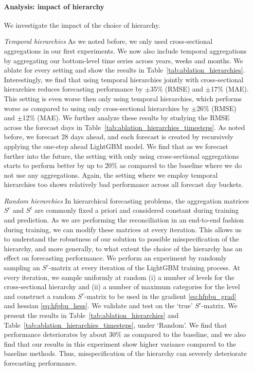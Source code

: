 \documentclass[preprint, 3p, times, twocolumn]{elsarticle}
\begin{document}
  \paragraph{Analysis: impact of hierarchy} We investigate the impact of the choice of hierarchy. 
  
  \textit{Temporal hierarchies} As we noted before, we only used cross-sectional aggregations in our first experiments. We now also include temporal aggregations by aggregating our bottom-level time series across years, weeks and months. We ablate for every setting and show the results in Table~\ref{tab:ablation_hierarchies}. Interestingly, we find that using temporal hierarchies jointly with cross-sectional hierarchies reduces forecasting performance by $\pm$35\% (RMSE) and $\pm$17\% (MAE). This setting is even worse then only using temporal hierarchies, which performs worse as compared to using only cross-sectional hierarchies by $\pm$26\% (RMSE) and $\pm$12\% (MAE). We further analyze these results by studying the RMSE across the forecast days in Table~\ref{tab:ablation_hierarchies_timesteps}. As noted before, we forecast 28 days ahead, and each forecast is created by recursively applying the one-step ahead LightGBM model. We find that as we forecast further into the future, the setting with only using cross-sectional aggregations starts to perform better by up to 20\% as compared to the baseline where we do not use any aggregations. Again, the setting where we employ temporal hierarchies too shows relatively bad performance across all forecast day buckets.  
  
  \textit{Random hierarchies} In hierarchical forecasting problems, the aggregation matrices \(S^c\) and \(S^t\) are commonly fixed a priori and considered constant during training and prediction. As we are performing the reconciliation in an end-to-end fashion during training, we can modify these matrices at every iteration. This allows us to understand the robustness of our solution to possible misspecification of the hierarchy, and more generally, to what extent the choice of the hierarchy has an effect on forecasting performance. We perform an experiment by randomly sampling an \(S^c\)-matrix at every iteration of the LightGBM training process. At every iteration, we sample uniformly at random (i) a number of levels for the cross-sectional hierarchy and (ii) a number of maximum categories for the level and construct a random \(S^c\)-matrix to be used in the gradient \eqref{eq:hfpbu_grad} and hessian \eqref{eq:hfpbu_hess}. We validate and test on the `true' \(S^c\)-matrix. We present the results in Table~\ref{tab:ablation_hierarchies} and Table~\ref{tab:ablation_hierarchies_timesteps}, under `Random'. We find that performance deteriorates by about 30\% as compared to the baseline, and we also find that our results in this experiment show higher variance compared to the baseline methods. Thus, misspecification of the hierarchy can severely deteriorate forecasting performance.
  
\end{document}
